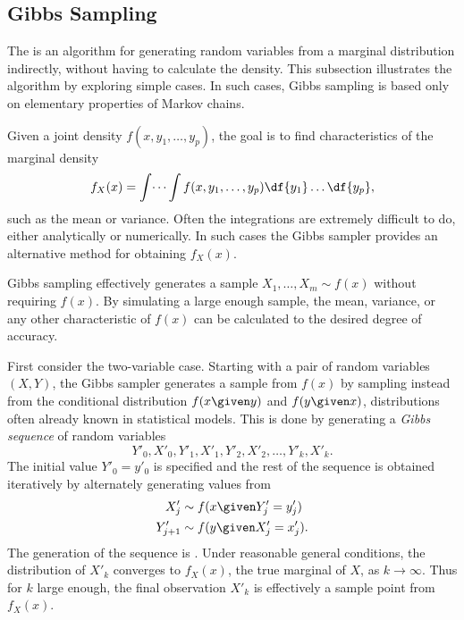 \documentclass[12pt]{article}
\begin{document}
\subsection*{Gibbs Sampling}

The  is an algorithm for generating random variables from a
marginal distribution indirectly, without having to calculate the
density. This subsection illustrates the algorithm by exploring simple
cases.  In such cases, Gibbs sampling is based only on elementary
properties of Markov chains.

Given a joint density \( f(x, y_1, \dots, y_p) \),%
the goal is to find characteristics of the marginal density%
\[
    f_{X}(x) = \int \dots \int f(x, y_1, \dots, y_p) \df{y_1} \dots \df{y_p},
\] such as the mean or variance. Often the integrations are extremely
difficult to do, either analytically or numerically.  In such cases the
Gibbs sampler provides an alternative method for obtaining \( f_X(x) \).

Gibbs sampling%
effectively generates a sample \( X_1, \dots, X_m \sim f(x) \) without
requiring \( f(x) \).  By simulating a large enough sample, the mean,
variance, or any other characteristic of \( f(x) \) can be calculated to
the desired degree of accuracy.

First consider the two-variable case.  Starting with a pair of random
variables \( (X, Y) \), the Gibbs sampler generates a sample from \( f(x)
\) by sampling instead from the conditional distribution \( f(x \given
y) \) and \( f(y \given x) \), distributions often already known in
statistical models.  This is done by generating a \emph{Gibbs sequence}%
of random variables
\begin{equation}
    Y'_0, X'_0, Y'_1, X'_1, Y'_2, X'_2, \dots, Y'_k, X'_k.%
    \label{eq:applicationsmetropolis:gibbsseq}
\end{equation}
The initial value \( Y'_0 = y'_0 \) is specified and the rest of the
sequence is obtained iteratively by alternately generating values from
\begin{align*}
    X'_j &\sim f(x \given Y'_j = y'_j) \\
    Y'_{j+1} &\sim f(y \given X'_j = x'_j).  \\
\end{align*}
The generation of the sequence is .%
Under reasonable general conditions, the distribution of \( X'_k \)
converges to \( f_X(x) \), the true marginal of \( X \), as \( k \to
\infty \).  Thus for \( k \) large enough, the final observation \( X'_k
\) is effectively a sample point from \( f_X(x) \).
\end{document}
